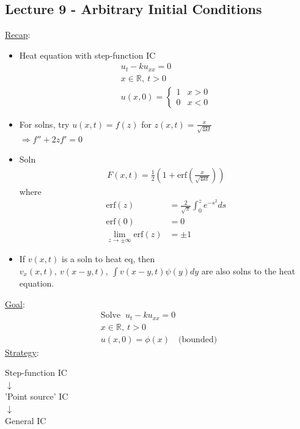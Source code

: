 \documentclass[12pt, letterpaper]{article}
\begin{document}
\subsection{Lecture 9 - Arbitrary Initial Conditions}
\underline{Recap}: 
\begin{itemize}
    \item Heat equation with step-function IC
    \begin{align*}
        u_t - ku_{xx} = 0 \\
        x \in \mathbb{R},\ t > 0 \\
        u(x,0) = \begin{cases}
            1 & x > 0 \\
            0 & x < 0
        \end{cases}
    \end{align*}
    \item For solns, try $u(x,t) = f(z)$ for $z(x,t) = \frac{x}{\sqrt{4kt}}$ \\
    $\Rightarrow f'' + 2zf' = 0$
    \item Soln 
    \begin{align*}
        F(x,t) = \frac 12 (1 + \text{erf}(\frac{x}{\sqrt{4kt}}))
    \end{align*}
    where 
    \begin{align*}
        \text{erf}(z) &= \frac{2}{\sqrt{\pi}}\int_{0}^{z}e^{-s^2}ds \\
        \text{erf}(0) &= 0 \\
        \lim_{z \rightarrow \pm \infty} \text{erf}(z) &= \pm 1
    \end{align*}
    \item If $v(x,t)$ is a soln to heat eq, then $v_x(x,t),\ v(x-y,t),\ \int v(x-y,t)\psi(y)dy$ 
    are also solns to the heat equation.
\end{itemize}
\underline{Goal}: 
\begin{align*}
    \text{Solve }\ u_t - ku_{xx} = 0 \\
    x \in \mathbb{R},\ t > 0 \\
    u(x,0) = \phi(x)\quad \text{(bounded)}
\end{align*}
\underline{Strategy}: 
\begin{center}
    Step-function IC \\
    $\downarrow$ \\
    'Point source' IC \\
    $\downarrow$ \\
    General IC
\end{center}
\end{document}

